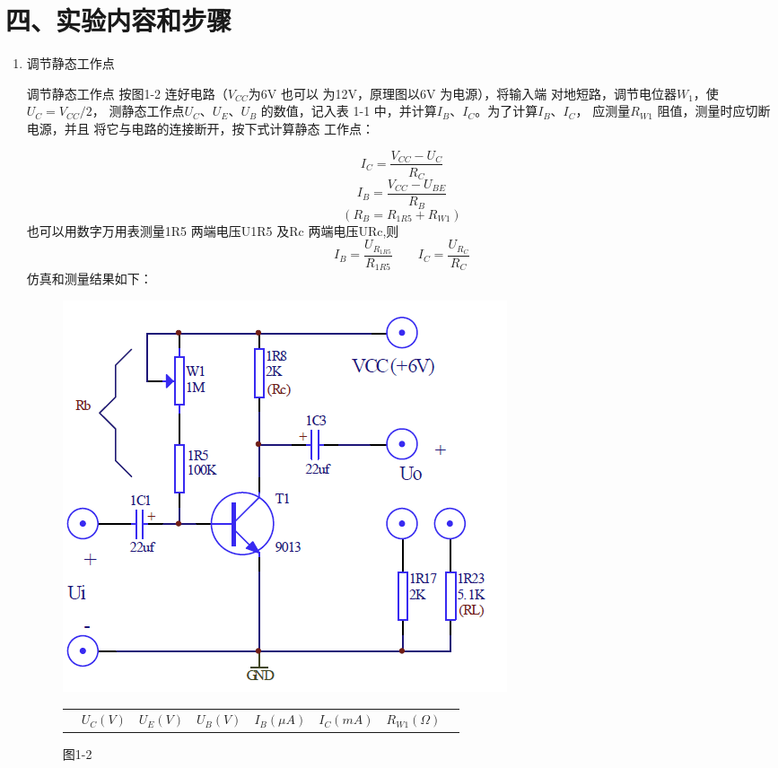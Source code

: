 \documentclass[a4paper,10pt,notitlepage]{article}
\begin{document}
		\section*{四、实验内容和步骤}
		\begin{enumerate}
			\item 调节静态工作点\par
			调节静态工作点
			按图1-2 连好电路（$V_{CC}$为6V 也可以
			为12V，原理图以6V 为电源），将输入端
			对地短路，调节电位器$W_1$，使$U_C=V_{CC}/2$，
			测静态工作点$U_C$、$U_E$、$U_B$ 的数值，记入表
			1-1 中，并计算$I_B$、$I_C$。为了计算$I_B$、$I_C$，
			应测量$R_{W1}$ 阻值，测量时应切断电源，并且
			将它与电路的连接断开，按下式计算静态
			工作点：
			
			$$I_C=\frac{V_{CC}-U_C}{R_C}$$
			$$I_B=\frac{V_{CC}-U_{BE}}{R_B}$$
			$$(R_B=R_{1R5}+R_{W1})$$
			也可以用数字万用表测量1R5 两端电压U1R5 及Rc 两端电压URc,则
			$$I_B=\frac{U_{R_{1R5}}}{R_{1R5}}\qquad I_C=\frac{U_{R_C}}{R_C}$$   
			仿真和测量结果如下：
			\begin{figure}[h]
				\raggedright
				\begin{minipage}{0.3\textwidth}
					\centering
					\includegraphics[width=\textwidth]{1-3.png}
					\caption*{图1-2}
				\end{minipage}
				\qquad
				\begin{minipage}{0.28\textwidth}
					\centering
					\begin{tabular}{|c|c|c|c|c|c|c|c|}
						\hline
						 & $U_C(V)$ & $U_E(V)$ & $U_B(V)$ & $I_B(\mu A)$ & $I_C(mA)$ & $R_{W1}(\Omega)$\\

\end{tabular}
\end{minipage}
\end{figure}
\end{enumerate}
\end{document}
